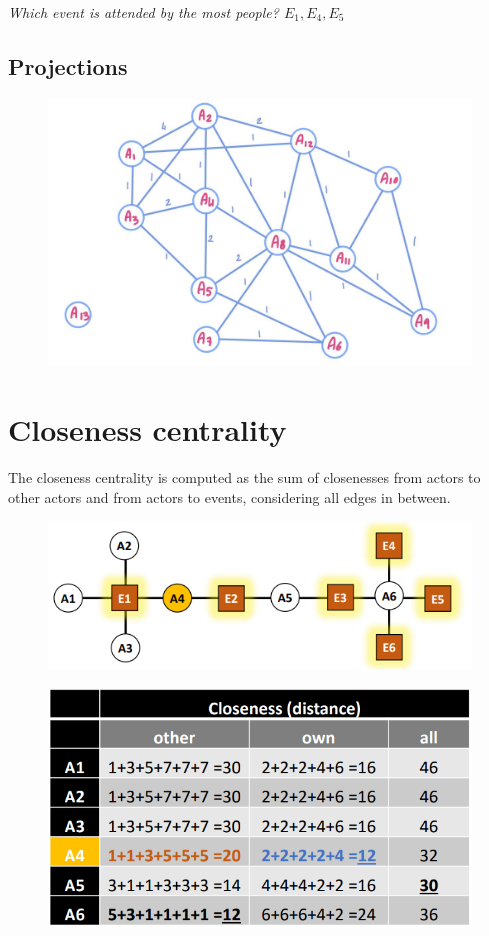 \documentclass[
  notitlepage,
  onecolumn,
  openany]{book}
\begin{document}
\emph{Which event is attended by the most people? \(E_1, E_4, E_5\)}

\hypertarget{projections}{%
\subsection{Projections}\label{projections}}

\begin{figure}[h!]

{\centering \includegraphics[width=0.5\linewidth]{images/10-Two mode networks/Untitled 7} 

}

\end{figure}

\hypertarget{closeness-centrality-1}{%
\section{Closeness centrality}\label{closeness-centrality-1}}

The closeness centrality is computed as the sum of closenesses from actors to other actors and from actors to events, considering all edges in between.

\begin{figure}[h!]

{\centering \includegraphics[width=0.5\linewidth]{images/10-Two mode networks/Untitled 8} 

}

\end{figure}

\begin{figure}[h!]

{\centering \includegraphics[width=0.5\linewidth]{images/10-Two mode networks/Untitled 9} 

}

\end{figure}
\end{document}
